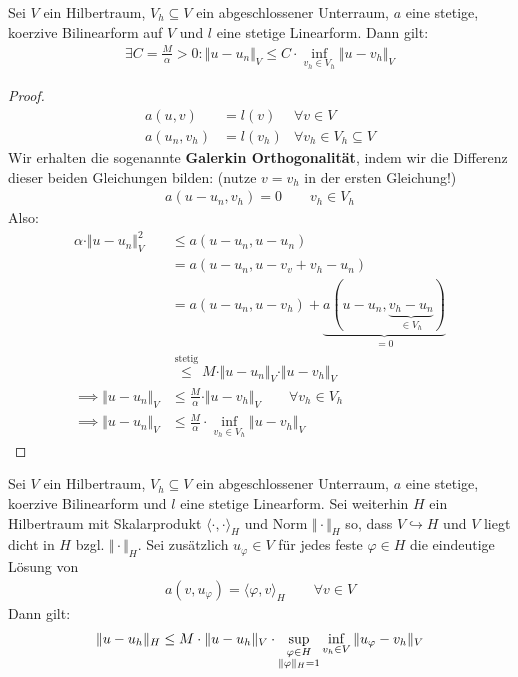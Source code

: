 \begin{theorem}\enter\label{theorem2.2CeasLemma}
Sei $V$ ein Hilbertraum, $V_h\subseteq V$ ein abgeschlossener Unterraum, $a$ eine stetige, koerzive Bilinearform auf $V$ und $l$ eine stetige Linearform. Dann gilt:
\begin{align*}
\exists C=\frac{M}{\alpha}>0:\Vert u-u_n\Vert_V\leq C\cdot\inf\limits_{v_h\in V_h}\Vert u-v_h\Vert_V
\end{align*}
\end{theorem}
\begin{proof}
\begin{align*}
a(u,v)&=l(v) &\forall v\in V\\
a(u_n,v_h)&= l(v_h) &\forall v_h\in V_h\subseteq V
\end{align*}
Wir erhalten die sogenannte \textbf{Galerkin Orthogonalität}, indem wir die Differenz dieser beiden Gleichungen bilden: (nutze $v=v_h$ in der ersten Gleichung!) 
\begin{align}\label{eqGalerkinOrthogonalitaet}\tag{GalerkinOrtho}
a(u-u_n,v_h)=0\qquad v_h\in V_h
\end{align}
Also:
\begin{align*}
\alpha\cdot\Vert u-u_n\Vert^2_V
&\leq
a(u-u_n,u-u_n)\\
&=a(u-u_n,u-v_v+v_h- u_n)\\
&=a(u-u_n,u-v_h)+\underbrace{a(u-u_n,\underbrace{v_h-u_n}_{\in V_h})}_{=0}\\
&\stackrel{\text{stetig}}{\leq}
M\cdot\Vert u-u_n\Vert_V\cdot\Vert u-v_h\Vert_V\\
\implies
\Vert u-u_n\Vert_V&\leq\frac{M}{\alpha}\cdot\Vert u-v_h\Vert_V\qquad\forall v_h\in V_h\\
\implies
\Vert u-u_n\Vert_V&\leq \frac{M}{\alpha}\cdot\inf\limits_{v_h\in V_h}\Vert u-v_h\Vert_V
\end{align*}
\end{proof}

\begin{theorem}\enter\label{theorem2.3AubinNietscheDualitaetsargument}
Sei $V$ ein Hilbertraum, $V_h\subseteq V$ ein abgeschlossener Unterraum, $a$ eine stetige, koerzive Bilinearform und $l$ eine stetige Linearform. Sei weiterhin $H$ ein Hilbertraum mit Skalarprodukt $\langle\cdot,\cdot\rangle_H$ und Norm $\Vert\cdot\Vert_H$ so, dass $V\hookrightarrow H$ und $V$ liegt dicht in $H$ bzgl. $\Vert\cdot\Vert_H$. Sei zusätzlich $u_\varphi\in V$ für jedes feste $\varphi\in H$ die eindeutige Lösung von
\begin{align}\label{Dtheorem2.3}\tag{D}
a(v,u_\varphi)=\langle\varphi,v\rangle_H\qquad\forall v\in V
\end{align}
Dann gilt:
\begin{align*}
\Vert u-u_h\Vert_H\leq M\cdot\Vert u-u_h\Vert_V\cdot\sup\limits_{\begin{subarray}{c}\varphi\in H\\\Vert\varphi\Vert_H=1\end{subarray}}\inf\limits_{v_h\in V}\Vert u_\varphi-v_h\Vert_V
\end{align*}
\end{theorem}

